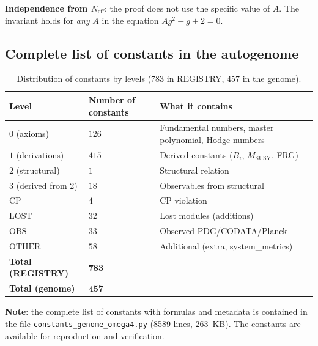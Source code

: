 \documentclass[11pt,a4paper]{article}
\theoremstyle{definition}
\begin{document}
\medskip\noindent
\textbf{Independence from $N_{\text{eff}}$}: the proof
does not use the specific value of $A$. The invariant holds
for \emph{any} $A$ in the equation $Ag^2 - g + 2 = 0$.

\subsection{Complete list of constants in the autogenome}
\label{app:frg-genome-summary}

\begin{table}[ht]
\centering
\small
\setlength{\tabcolsep}{4pt}
\caption{Distribution of constants by levels (783 in REGISTRY, 457 in the genome).}
\label{tab:app-genome-summary}
\begin{tabular}{@{}p{2.6cm}p{2.6cm}p{10cm}@{}}
\toprule
Level & Number of constants & What it contains \\
\midrule
$0$ (axioms) & $126$ & Fundamental numbers, master polynomial, Hodge numbers \\
$1$ (derivations) & $415$ & Derived constants ($B_i$, $M_{\text{SUSY}}$, FRG) \\
$2$ (structural) & $1$ & Structural relation \\
$3$ (derived from 2) & $18$ & Observables from structural \\
$\text{CP}$ & $4$ & CP violation \\
$\text{LOST}$ & $32$ & Lost modules (additions) \\
$\text{OBS}$ & $33$ & Observed PDG/CODATA/Planck \\
$\text{OTHER}$ & $58$ & Additional (extra, system\_metrics) \\
\midrule
\textbf{Total (REGISTRY)} & $\mathbf{783}$ & \\
\textbf{Total (genome)} & $\mathbf{457}$ & \\
\bottomrule
\end{tabular}
\end{table}

\medskip\noindent
\textbf{Note}: the complete list of constants with formulas and
metadata is contained in the file \texttt{constants\_genome\_omega4.py}
(8589 lines, 263~KB). The constants are available for reproduction
and verification.

\end{document}
